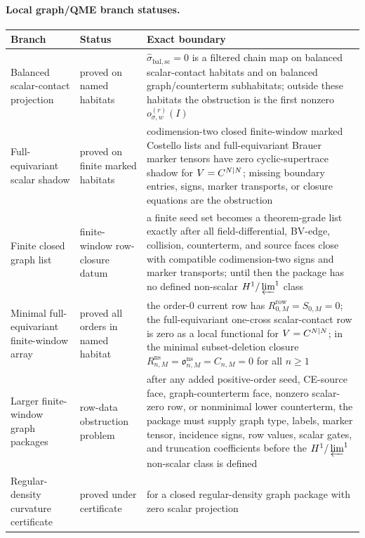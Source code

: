 \medskip
\paragraph{Local graph/QME branch statuses.}

\begin{center}
\begin{tabular}{p{}p{}p{}}
\textbf{Branch} & \textbf{Status} & \textbf{Exact boundary}\\
\hline
Balanced scalar-contact projection & proved on named habitats &
\(\widehat\sigma_{\mathrm{bal,sc}}=0\) is a filtered chain map on
balanced scalar-contact habitats and on balanced graph/counterterm
subhabitats; outside these habitats the obstruction is the first
nonzero \(o_{\sigma,w}^{(r)}(I)\)\\
Full-equivariant scalar shadow & proved on finite marked habitats &
codimension-two closed finite-window marked Costello lists and
full-equivariant Brauer marker tensors have zero cyclic-supertrace
shadow for \(V=C^{N|N}\); missing boundary entries, signs, marker
transports, or closure equations are the obstruction\\
Finite closed graph list & finite-window row-closure datum &
a finite seed set becomes a theorem-grade list exactly after all
field-differential, BV-edge, collision, counterterm, and source faces
close with compatible codimension-two signs and marker transports; until
then the package has no defined non-scalar \(H^1/\varprojlim^1\) class\\
Minimal full-equivariant finite-window array & proved all orders in named
habitat &
the order-\(0\) current row has \(R^{\mathrm{row}}_{0,M}=S_{0,M}=0\);
the full-equivariant one-cross scalar-contact row is zero as a local
functional for \(V=C^{N|N}\); in the minimal subset-deletion closure
\(R^{\mathrm{ns}}_{n,M}=\mathfrak o^{\mathrm{ns}}_{n,M}=C_{n,M}=0\) for
all \(n\geq1\)\\
Larger finite-window graph packages & row-data obstruction problem &
after any added positive-order seed, CE-source face, graph-counterterm
face, nonzero scalar-zero row, or nonminimal lower counterterm, the
package must supply graph type, labels, marker tensor, incidence signs,
row values, scalar gates, and truncation coefficients before the
\(H^1/\varprojlim^1\) non-scalar class is defined\\
Regular-density curvature certificate & proved under certificate &
for a closed regular-density graph package with zero scalar projection

\end{tabular}
\end{center}
